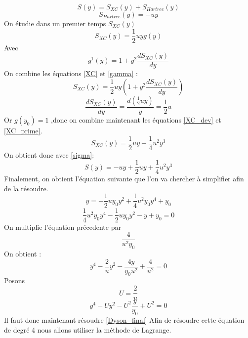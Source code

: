 \documentclass[12pt]{article}
\begin{document}
\begin{equation}
\label{sigma}
	S(y) = S_{XC}(y) + S_{Hartree}(y)
\end{equation}
\begin{equation}
\label{Hartree} 
	S_{Hartree}(y) = -uy
\end{equation}
On \'etudie dans un premier temps $S_{XC}(y)$ 
\begin{equation}
\label{XC} 
	S_{XC}(y) = \frac{1}{2} u y g(y)
\end{equation}
Avec
\begin{equation} 
\label{gamma} 
	g^1(y) = 1 + y^2 \frac{dS_{XC}(y)}{dy} 
\end{equation}
On combine les \'equations \ref{XC} et \ref{gamma} : 
\begin{equation} 
\label{XC_dev}
	S_{XC}(y) = \frac{1}{2} u y (1 + y^2 \frac{dS_{XC}(y)}{dy})
\end{equation}
\begin{equation} 
\label{XC_prime} 
	\frac{dS_{XC}(y)}{dy} = \frac{d(\frac{1}{2} u y )}{y} = \frac{1}{2} u 
\end{equation}
Or $g(y_0) = 1$ ,donc on combine maintenant les \'equations \ref{XC_dev}  et \ref{XC_prime}.
\begin{equation}
\label{XC_final} 
	S_{XC}(y) = \frac{1}{2} u y + \frac{1}{4} u^2 y^3 
\end{equation}
On obtient donc avec \ref{sigma}: 
\begin{equation}
\label{Sigma_final} 
	S(y) = -uy +  \frac{1}{2} u y + \frac{1}{4} u^2 y^3 
\end{equation}
Finalement, on obtient l'\'equation suivante que l'on va chercher \`a simplifier afin de la r\'esoudre.
\begin{equation}
	y = -\frac{1}{2} u y_0 y^2 + \frac{1}{4} u^2 y_0 y^4 + y_0
\end{equation}
\begin{equation}
	\frac{1}{4} u^2 y_0 y^4 -\frac{1}{2} u y_0 y^2 - y + y_0 = 0
\end{equation}
On multiplie l'\'equation pr\'ecedente par $$ \frac{4}{u^2 y_0}$$
On obtient : 
\begin{equation}
	y^4 -\frac{2}{u} y^2 - \frac{4y}{y_0  u^2} + \frac{4}{u^2} = 0
\end{equation}
Posons $$ U = \frac{2}{u}$$
\begin{equation}
\label{Dyson_final} 
	y^4 - U y^2 - U^2\frac{y}{y_0} + U^2 = 0
\end{equation}
Il faut donc maintenant r\'esoudre \ref{Dyson_final}
%
Afin de résoudre cette \'equation de degr\'e 4 nous allons utiliser la m\'ethode de Lagrange.
\end{document}
